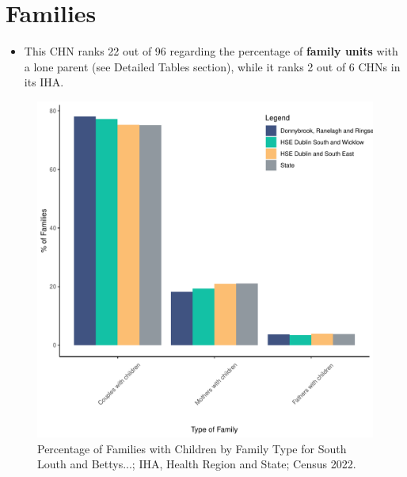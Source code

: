 \documentclass{article}
\begin{document}
\section{Families}\label{sect:Fam}
\begin{itemize}
\item This CHN ranks  22 out of 96 regarding the percentage of \textbf{family units} with a lone parent (see Detailed Tables section), while it ranks   2 out of 6 CHNs in its IHA.
\end{itemize}
\begin{figure}[H]
	\centering
	\includegraphics[width = 150mm]{../figures/FamED.pdf}
	\caption{Percentage of Families with Children by Family Type for South Louth and Bettys...; IHA, Health Region and State; Census 2022.}
	\label{fig:vbnv}
	\end{figure}
	
\end{document}
